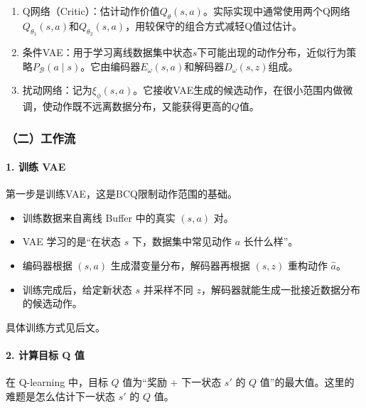 \begin{enumerate}
\def\labelenumi{\arabic{enumi}.}
\tightlist
\item
  Q网络（Critic）：估计动作价值\(Q_\theta(s,a)\)。实际实现中通常使用两个Q网络\(Q_{\theta_1}(s,a)\)和\(Q_{\theta_2}(s,a)\)，用较保守的组合方式减轻Q值过估计。
\item
  条件VAE：用于学习离线数据集中状态\(s\)下可能出现的动作分布，近似行为策略\(P_{\mathcal B}(a \mid s)\)。它由编码器\(E_\omega(s,a)\)和解码器\(D_\omega(s,z)\)组成。
\item
  扰动网络：记为\(\xi_\phi(s,a)\)。它接收VAE生成的候选动作，在很小范围内做微调，使动作既不远离数据分布，又能获得更高的\(Q\)值。
\end{enumerate}

\hypertarget{ux4e8cux5de5ux4f5cux6d41}{%
\subsubsection{（二）工作流}\label{ux4e8cux5de5ux4f5cux6d41}}

\hypertarget{ux8badux7ec3-vae}{%
\paragraph{1. 训练 VAE}\label{ux8badux7ec3-vae}}

第一步是训练VAE，这是BCQ限制动作范围的基础。

\begin{itemize}
\tightlist
\item
  训练数据来自离线 Buffer 中的真实 \((s,a)\) 对。
\item
  VAE 学习的是``在状态 \(s\) 下，数据集中常见动作 \(a\) 长什么样''。
\item
  编码器根据 \((s,a)\) 生成潜变量分布，解码器再根据 \((s,z)\) 重构动作 \(\hat{a}\)。
\item
  训练完成后，给定新状态 \(s\) 并采样不同 \(z\)，解码器就能生成一批接近数据分布的候选动作。
\end{itemize}

具体训练方式见后文。

\hypertarget{ux8ba1ux7b97ux76eeux6807-q-ux503c}{%
\paragraph{2. 计算目标 Q 值}\label{ux8ba1ux7b97ux76eeux6807-q-ux503c}}

在 Q-learning 中，目标 \(Q\) 值为``奖励 + 下一状态 \(s'\) 的 \(Q\) 值''的最大值。这里的难题是怎么估计下一状态 \(s'\) 的 \(Q\) 值。

